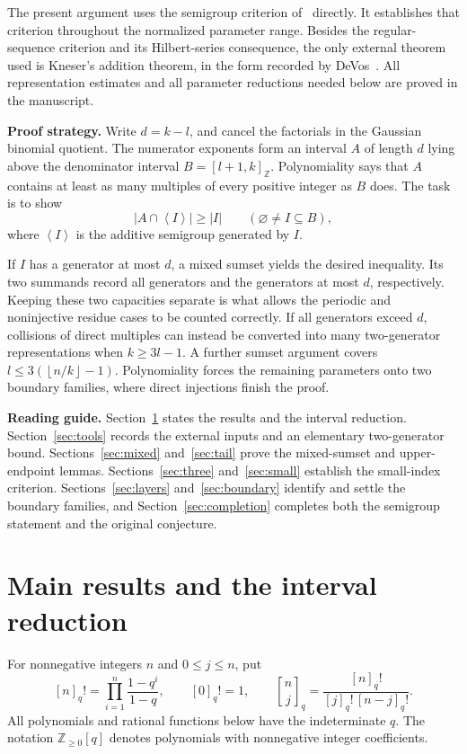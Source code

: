\documentclass[11pt,a4paper]{article}
\numberwithin{equation}{section}
\theoremstyle{remark}
\newcommand{\Z}{\mathbb Z}
\newcommand{\Nzero}{\mathbb Z_{\ge 0}}
\newcommand{\sg}[1]{\left\langle #1\right\rangle}
\newcommand{\floor}[1]{\left\lfloor #1\right\rfloor}
\newcommand{\qbinom}[2]{\genfrac{[}{]}{0pt}{}{#1}{#2}_{q}}
\newcommand{\interval}[2]{[#1,#2]_{\Z}}
\begin{document}
The present argument uses the semigroup criterion of~\cite{GLY} directly.
It establishes that criterion throughout the normalized parameter range.
Besides the regular-sequence criterion and its Hilbert-series consequence,
the only external theorem used is Kneser's addition theorem, in the form
recorded by DeVos~\cite{DeVos}. All representation estimates and all
parameter reductions needed below are proved in the manuscript.

\textbf{Proof strategy.}
Write $d=k-l$, and cancel the factorials in the Gaussian binomial quotient.
The numerator exponents form an interval $A$ of length $d$ lying above the
denominator interval $B=\interval{l+1}{k}$. Polynomiality says that $A$
contains at least as many multiples of every positive integer as $B$ does.
The task is to show
\[
  |A\cap\sg{I}|\ge |I|
  \qquad(\varnothing\ne I\subseteq B),
\]
where $\sg{I}$ is the additive semigroup generated by $I$.

If $I$ has a generator at most $d$, a mixed sumset yields the desired
inequality. Its two summands record all generators and the generators at
most $d$, respectively. Keeping these two capacities separate is what
allows the periodic and noninjective residue cases to be counted correctly.
If all generators exceed $d$, collisions of direct multiples can instead
be converted into many two-generator representations when $k\ge3l-1$.
A further sumset argument covers $l\le3(\floor{n/k}-1)$. Polynomiality
forces the remaining parameters onto two boundary families, where direct
injections finish the proof.

\textbf{Reading guide.}
Section~\ref{sec:setup} states the results and the interval reduction.
Section~\ref{sec:tools} records the external inputs and an elementary
two-generator bound. Sections~\ref{sec:mixed} and~\ref{sec:tail} prove the
mixed-sumset and upper-endpoint lemmas.
Sections~\ref{sec:three} and~\ref{sec:small} establish the small-index
criterion. Sections~\ref{sec:layers} and~\ref{sec:boundary} identify and
settle the boundary families, and Section~\ref{sec:completion} completes
both the semigroup statement and the original conjecture.

\section{Main results and the interval reduction}\label{sec:setup}

For nonnegative integers $n$ and $0\le j\le n$, put
\begin{equation}\label{eq:qbinom}
  [n]_q!=\prod_{i=1}^{n}\frac{1-q^i}{1-q},
  \qquad [0]_q!=1,
  \qquad
  \qbinom{n}{j}=\frac{[n]_q!}{[j]_q!\,[n-j]_q!}.
\end{equation}
All polynomials and rational functions below have the indeterminate $q$.
The notation $\Nzero[q]$ denotes polynomials with nonnegative integer
coefficients.
\end{document}
